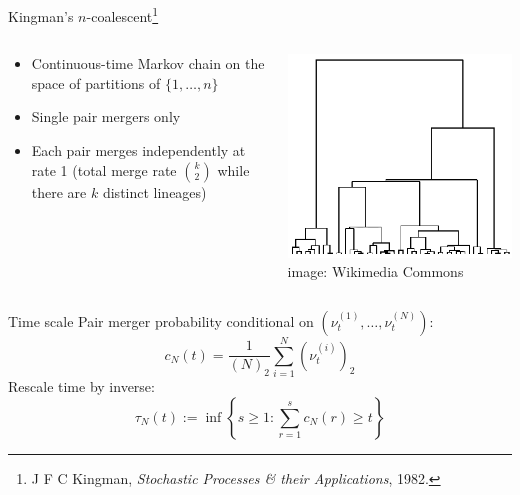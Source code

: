 \documentclass[aspectratio=169]{beamer}
\theoremstyle{definition}
\newcommand{\vt}[2][t]{\nu_{#1}^{(#2)}}
\begin{document}
\begin{frame}{Kingman's $n$-coalescent\footnote[frame]{J F C Kingman, \textit{Stochastic Processes \& their Applications}, 1982.}}
\begin{columns}
\begin{column}{0.45\textwidth}
\begin{itemize}
\item Continuous-time Markov chain on the space of partitions of $\{1,\dots,n\}$
\item Single pair mergers only
\item Each pair merges independently at rate 1 (total merge rate $\binom{k}{2}$ while there are $k$ distinct lineages)
\end{itemize}
\end{column}
\begin{column}{0.45\textwidth}
\includegraphics[width=\textwidth]{kingman.png}
\hspace*{\fill} \tiny{image: Wikimedia Commons}
\end{column}
\end{columns}
\end{frame}


\begin{frame}{Time scale}
Pair merger probability conditional on $( \vt{1},\dots, \vt{N} )$:
\begin{equation*}
c_N(t) = \frac{1}{(N)_2} \sum_{i=1}^N (\vt{i})_2
\end{equation*}
\pause
Rescale time by inverse:
\begin{equation*}
\tau_N(t) := \inf\left\{ s\geq 1 : \sum_{r=1}^s c_N(r) \geq t \right\}
\end{equation*}
\end{frame}
\end{document}
